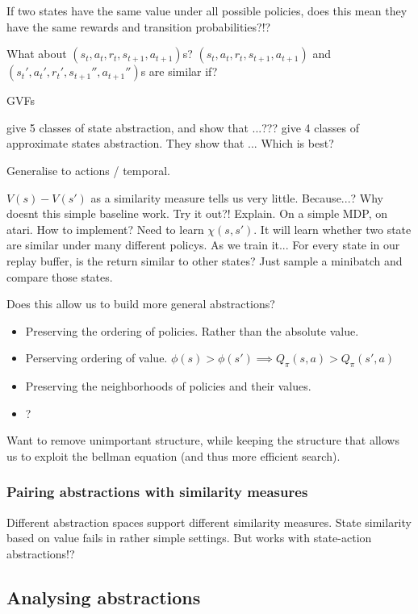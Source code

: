 If two states have the same value under all possible policies, does this mean
they have the same rewards and transition probabilities?!?

What about $(s_t, a_t, r_t, s_{t+1}, a_{t+1})$s? $(s_t, a_t, r_t, s_{t+1}, a_{t+1})$ and $(s_t', a_t', r_t', s_{t+1}'', a_{t+1}'')$s are similar if?

GVFs

\cite{Littman2006} give 5 classes of state abstraction, and show that ...???
\cite{Abel2017} give 4 classes of approximate states abstraction. They show that ...
Which is best?

Generalise to actions / temporal.

$V(s) - V(s')$ as a similarity measure tells us very little. Because...?
Why doesnt this simple baseline work. Try it out?! Explain.
On a simple MDP, on atari. How to implement? Need to learn $\chi(s, s')$.
It will learn whether two state are similar under many different policys. As we train it...
For every state in our replay buffer, is the return similar to other states?
Just sample a minibatch and compare those states.

Does this allow us to build more general abstractions?

\begin{itemize}
\tightlist
  \item Preserving the ordering of policies. Rather than the absolute value.
  \item Perserving ordering of value. $\phi(s) > \phi(s') \implies Q_{\pi}(s, a) > Q_{\pi}(s', a)$
  \item Preserving the neighborhoods of policies and their values.
  \item ?
\end{itemize}

Want to remove unimportant structure, while keeping the structure that allows us
to exploit the bellman equation (and thus more efficient search).



\subsubsection{Pairing abstractions with similarity measures}

Different abstraction spaces support different similarity measures.
State similarity based on value fails in rather simple settings.
But works with state-action abstractions!?



\subsection{Analysing abstractions}

